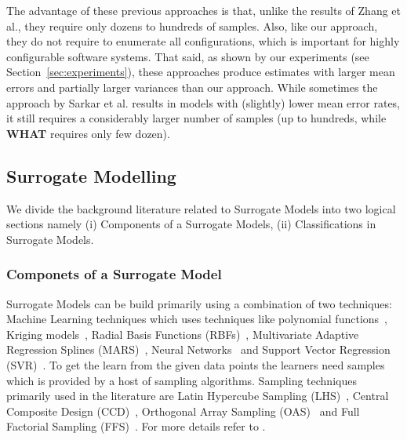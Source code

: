 \documentclass{newsig}
\newcommand{\what}{{\bf WHAT }}
\begin{document}
The advantage of these previous approaches is that, unlike  the results of Zhang et al., they require only dozens to hundreds of samples. Also, like our approach, they do not require to enumerate all configurations, which is important for highly configurable software systems. 
That said, as shown by our experiments (see Section~\ref{sec:experiments}), these approaches produce estimates with  larger mean errors and partially larger variances than our approach. While sometimes the approach by Sarkar et al. results in  models with (slightly)
lower mean error rates, it still requires a considerably larger number of samples (up to hundreds, while \what requires only few dozen).



\subsection{Surrogate Modelling}
We divide the background literature related to Surrogate Models into two logical sections namely (i) Components of a Surrogate Models, (ii) Classifications in Surrogate Models.

\subsubsection{Componets of a Surrogate Model}
Surrogate Models can be build primarily using a combination of two techniques: Machine Learning techniques which uses techniques like polynomial functions~\cite{madsen2000response}, Kriging models~\cite{kleijnen2009kriging}, Radial Basis Functions (RBFs)~\cite{buhmann2004radial}, Multivariate Adaptive Regression Splines (MARS)~\cite{friedman1991multivariate}, Neural Networks~\cite{hagan1996neural} and Support Vector Regression (SVR)~\cite{smola2004tutorial}. To get the learn from the given data points the learners need samples which is provided by a host of sampling algorithms. Sampling techniques primarily used in the literature are Latin Hypercube Sampling (LHS)~\cite{helton2006survey}, Central Composite Design (CCD)~\cite{jin2001comparative}, Orthogonal Array Sampling (OAS)~\cite{jin2001comparative} and Full Factorial Sampling (FFS)~\cite{jin2001comparative}. For more details refer to \cite{tabatabaei2015survey}.
\end{document}
